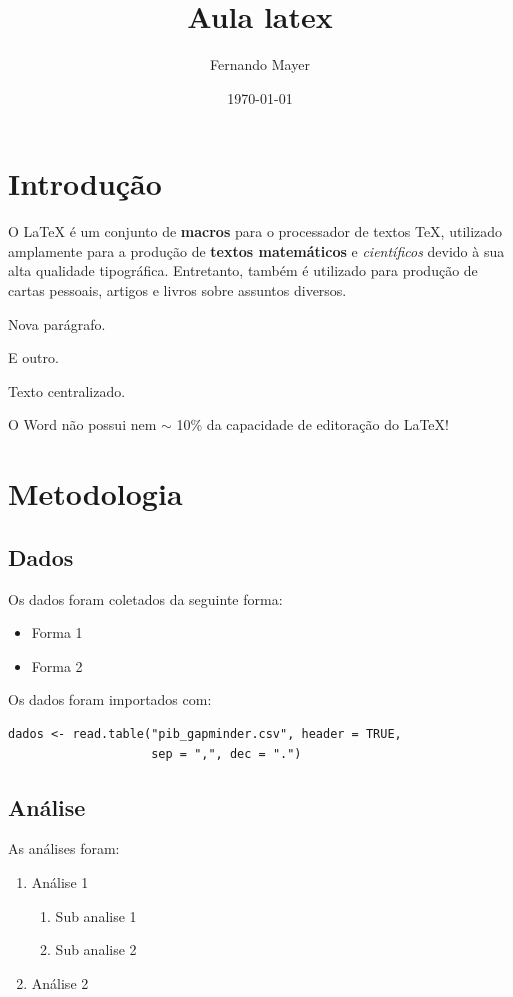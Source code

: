 \documentclass[a4paper]{article}
\title{Aula latex}
\author{Fernando Mayer}
\date{\today}
\begin{document}
\maketitle
\tableofcontents

\section{Introdução}

O LaTeX é um conjunto de {\bf macros} para o processador de textos TeX, utilizado amplamente para a produção de \textbf{textos matemáticos} e \textit{científicos} devido à sua alta qualidade tipográfica. Entretanto, também é utilizado para produção
de cartas pessoais, artigos e {\Large livros} sobre assuntos diversos.

Nova parágrafo.

E outro.

\begin{center}
Texto centralizado.
\end{center}

O Word não possui nem $\sim$ 10\% da capacidade de editoração do LaTeX!

\section{Metodologia}

\subsection{Dados}

Os dados foram coletados da seguinte forma:

\begin{itemize}
\item Forma 1
\item Forma 2
\end{itemize}

Os dados foram importados com:

\begin{verbatim}
dados <- read.table("pib_gapminder.csv", header = TRUE,
                    sep = ",", dec = ".")
\end{verbatim}

\subsection{Análise}

As análises foram:

\begin{enumerate}
\item Análise 1
\begin{enumerate}
\item Sub analise 1
\item Sub analise 2
\end{enumerate}
\item Análise 2
\end{enumerate}
\end{document}
